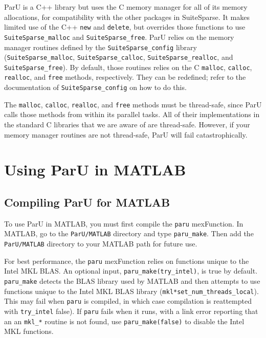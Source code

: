 \documentclass[12pt]{article}
\begin{document}
ParU is a C++ library but uses the C memory manager for all of its memory
allocations, for compatibility with the other packages in SuiteSparse.  It
makes limited use of the C++ \verb'new' and \verb'delete', but overrides those
functions to use \verb'SuiteSparse_malloc' and \verb'SuiteSparse_free'.  ParU
relies on the memory manager routines defined by the \newline
\verb'SuiteSparse_config'
library (\verb'SuiteSparse_malloc', \verb'SuiteSparse_calloc', \newline
\verb'SuiteSparse_realloc', and \verb'SuiteSparse_free').  By default, those
routines relies on the C \verb'malloc', \verb'calloc', \verb'realloc', and
\verb'free' methods, respectively.  They can be redefined; refer to the
documentation of \verb'SuiteSparse_config' on how to do this.

The \verb'malloc', \verb'calloc', \verb'realloc', and \verb'free' methods must
be thread-safe, since ParU calls those methods from within its parallel tasks.
All of their implementations in the standard C libraries that we are aware of
are thread-safe.  However, if your memory manager routines are not thread-safe,
ParU will fail catastrophically.

\section{Using ParU in MATLAB}

\subsection{Compiling ParU for MATLAB}

To use ParU in MATLAB, you must first compile the \verb'paru' mexFunction.
In MATLAB, go to the \verb'ParU/MATLAB' directory and type \verb'paru_make'.
Then add the \verb'ParU/MATLAB' directory to your MATLAB path for future use.

For best performance, the \verb'paru' mexFunction
relies on functions unique to the Intel MKL BLAS.
An optional input, \verb'paru_make(try_intel)', is true by default.
\verb'paru_make' detects the BLAS library used by MATLAB and then attempts to
use functions unique to the Intel MKL BLAS library
(\verb'mkl*set_num_threads_local').  This may fail when \verb'paru' is
compiled, in which case compilation is reattempted with \verb'try_intel'
false).  If \verb'paru' fails when it runs, with a link error reporting that an
an \verb'mkl_*' routine is not found, use \verb'paru_make(false)' to disable
the Intel MKL functions.
\end{document}
